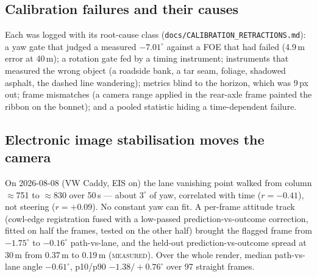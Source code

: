 \documentclass[10pt,a4paper]{article}
\newcommand{\meas}{\textsc{measured}}
\begin{document}
\subsection{Calibration failures and their causes}
Each was logged with its root-cause class (\texttt{docs/CALIBRATION\_RETRACTIONS.md}):
a yaw gate that judged a measured $-7.01^\circ$ against a FOE that had failed (4.9\,m error at 40\,m); a
rotation gate fed by a timing instrument; instruments that measured the wrong object (a roadside bank, a
tar seam, foliage, shadowed asphalt, the dashed line wandering); metrics blind to the horizon, which was
9\,px out; frame mismatches (a camera range applied in the rear-axle frame painted the ribbon on the bonnet);
and a pooled statistic hiding a time-dependent failure.

\subsection{Electronic image stabilisation moves the camera}
On 2026-08-08 (VW Caddy, EIS on) the lane vanishing point walked from column $\approx$751 to $\approx$830 over
50\,s --- about $3^\circ$ of yaw, correlated with time ($r=-0.41$), not steering ($r=+0.09$). No constant yaw
can fit. A per-frame attitude track (cowl-edge registration fused with a low-passed prediction-vs-outcome
correction, fitted on half the frames, tested on the other half) brought the flagged frame from
$-1.75^\circ$ to $-0.16^\circ$ path-vs-lane, and the held-out prediction-vs-outcome spread at 30\,m from
0.37\,m to 0.19\,m (\meas). Over the whole render, median path-vs-lane angle $-0.61^\circ$, p10/p90
$-1.38/+0.76^\circ$ over 97 straight frames.
\end{document}
